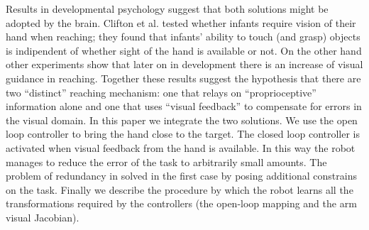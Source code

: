 Results in developmental psychology suggest that both solutions might be
adopted by the brain. Clifton et al. \cite{clifton93isvisually} 
tested whether infants require vision of their hand when reaching; they 
found that infants' ability to touch (and grasp) objects is indipendent 
of whether sight of the hand is available or not. On the other hand 
other experiments \cite{ashmead93visual}
show that later on in development there is an increase of visual guidance 
in reaching. Together these results suggest the hypothesis that there 
are two ``distinct'' reaching mechanism: one that relays on ``proprioceptive'' 
information alone and one that uses ``visual feedback'' to compensate 
for errors in the visual domain.
In this paper we integrate the two solutions. We use the open loop
controller to bring the hand close to the target. The closed loop controller 
is activated when visual feedback from the hand is available. In this
way the robot manages to reduce the error of the task to arbitrarily small 
amounts. The problem of redundancy in solved in the first case by posing 
additional constrains on the task. Finally we describe the procedure by 
which the robot learns all the transformations required by the controllers 
(the open-loop mapping and the arm visual Jacobian).